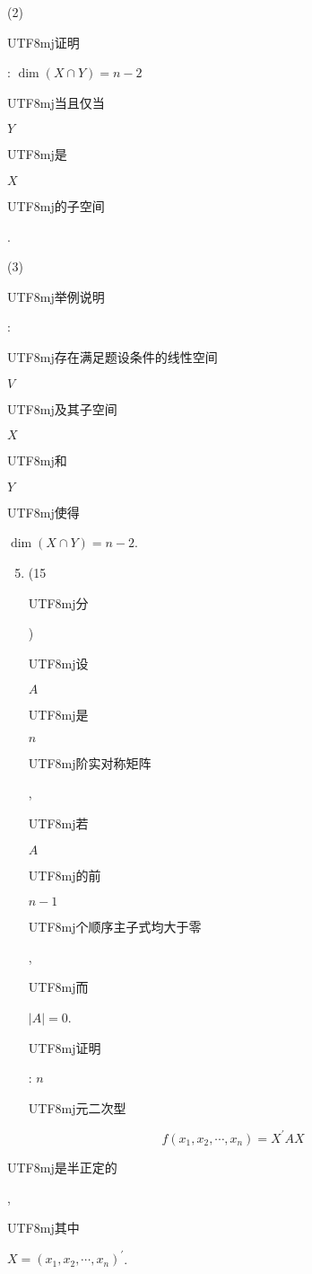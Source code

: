 \documentclass[10pt]{article}
\begin{document}
(2) \begin{CJK}{UTF8}{mj}证明\end{CJK}: $\operatorname{dim}(X \cap Y)=n-2$ \begin{CJK}{UTF8}{mj}当且仅当\end{CJK} $Y$ \begin{CJK}{UTF8}{mj}是\end{CJK} $X$ \begin{CJK}{UTF8}{mj}的子空间\end{CJK}.

(3) \begin{CJK}{UTF8}{mj}举例说明\end{CJK}: \begin{CJK}{UTF8}{mj}存在满足题设条件的线性空间\end{CJK} $V$ \begin{CJK}{UTF8}{mj}及其子空间\end{CJK} $X$ \begin{CJK}{UTF8}{mj}和\end{CJK} $Y$ \begin{CJK}{UTF8}{mj}使得\end{CJK} $\operatorname{dim}(X \cap Y)=n-2$.

\begin{enumerate}
  \setcounter{enumi}{4}
  \item (15 \begin{CJK}{UTF8}{mj}分\end{CJK}) \begin{CJK}{UTF8}{mj}设\end{CJK} $A$ \begin{CJK}{UTF8}{mj}是\end{CJK} $n$ \begin{CJK}{UTF8}{mj}阶实对称矩阵\end{CJK}, \begin{CJK}{UTF8}{mj}若\end{CJK} $A$ \begin{CJK}{UTF8}{mj}的前\end{CJK} $n-1$ \begin{CJK}{UTF8}{mj}个顺序主子式均大于零\end{CJK}, \begin{CJK}{UTF8}{mj}而\end{CJK} $|A|=0$. \begin{CJK}{UTF8}{mj}证明\end{CJK}: $n$ \begin{CJK}{UTF8}{mj}元二次型\end{CJK}
\end{enumerate}
$$
f\left(x_{1}, x_{2}, \cdots, x_{n}\right)=X^{\prime} A X
$$
\begin{CJK}{UTF8}{mj}是半正定的\end{CJK}, \begin{CJK}{UTF8}{mj}其中\end{CJK} $X=\left(x_{1}, x_{2}, \cdots, x_{n}\right)^{\prime}$.
\end{document}
